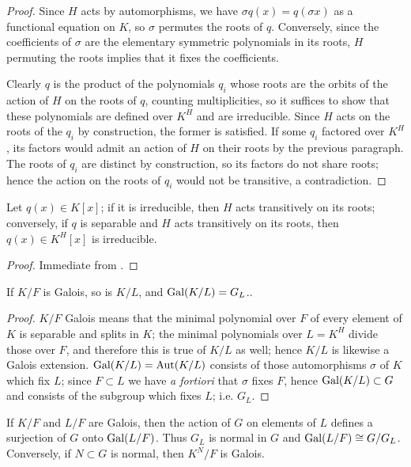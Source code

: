 \begin{proof} Since $H$ acts by automorphisms, we have $\sigma q(x) = q(\sigma
x)$ as a functional equation on $K$, so $\sigma$ permutes the roots of $q$.
Conversely, since the coefficients of $\sigma$ are the elementary symmetric
polynomials in its roots, $H$ permuting the roots implies that it fixes the
coefficients.

Clearly $q$ is the product of the polynomials $q_i$ whose roots are the orbits
of the action of $H$ on the roots of $q$, counting multiplicities, so it
suffices to show that these polynomials are defined over $K^H$ and are
irreducible.  Since $H$ acts on the roots of the $q_i$ by construction, the
former is satisfied.  If some $q_i$ factored over $K^H$, its factors would
admit an action of $H$ on their roots by the previous paragraph.  The roots of
$q_i$ are distinct by construction, so its factors do not share roots; hence
the action on the roots of $q_i$ would not be transitive, a contradiction.
\end{proof}

\begin{corollary} Let $q(x) \in K[x]$; if it is irreducible, then $H$ acts
transitively on its roots; conversely, if $q$ is separable and $H$ acts
transitively on its roots, then $q(x) \in K^H[x]$ is irreducible.
\label{sep_irred}
\end{corollary}

\begin{proof} Immediate from . \end{proof}

\begin{lemma} If $K/F$ is Galois, so is $K/L$, and $\operatorname{\text{Gal}}(K/L) = G_L$..
\label{sub_galois}
\end{lemma}

\begin{proof} $K/F$ Galois means that the minimal polynomial over $F$ of every
element of $K$ is separable and splits in $K$; the minimal polynomials over $L
= K^H$ divide those over $F$, and therefore this is true of $K/L$ as well;
hence $K/L$ is likewise a Galois extension. $\operatorname{\text{Gal}}(K/L) = \operatorname{\text{Aut}}(K/L)$ consists
of those automorphisms $\sigma$ of $K$ which fix $L$; since $F \subset L$ we
have \emph{a fortiori} that $\sigma$ fixes $F$, hence $\operatorname{\text{Gal}}(K/L) \subset G$
and consists of the subgroup which fixes $L$; i.e. $G_L$. \end{proof}

\begin{corollary} If $K/F$ and $L/F$ are Galois, then the action of $G$ on elements of $L$
defines a surjection of $G$ onto $\operatorname{\text{Gal}}(L/F)$.  Thus $G_L$ is normal in $G$ and $\operatorname{\text{Gal}}(L/F) \cong G/G_L$.  Conversely, if $N \subset G$ is normal, then $K^N/F$ is Galois.
\label{normal}
\end{corollary}

